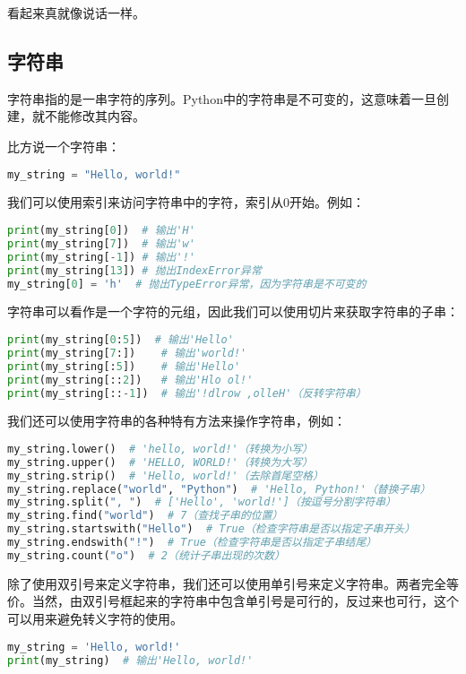 \documentclass[../main.tex]{subfiles}
\begin{document}
看起来真就像说话一样。

\subsection{字符串}

字符串指的是一串字符的序列。Python中的字符串是不可变的，这意味着一旦创建，就不能修改其内容。

比方说一个字符串：
\begin{lstlisting}[language=python]
my_string = "Hello, world!"
\end{lstlisting}
我们可以使用索引来访问字符串中的字符，索引从0开始。例如：
\begin{lstlisting}[language=python]
print(my_string[0])  # 输出'H'
print(my_string[7])  # 输出'w'
print(my_string[-1]) # 输出'!'
print(my_string[13]) # 抛出IndexError异常
my_string[0] = 'h'  # 抛出TypeError异常，因为字符串是不可变的
\end{lstlisting}

字符串可以看作是一个字符的元组，因此我们可以使用切片来获取字符串的子串：
\begin{lstlisting}[language=python]
print(my_string[0:5])  # 输出'Hello'
print(my_string[7:])    # 输出'world!'
print(my_string[:5])    # 输出'Hello'
print(my_string[::2])   # 输出'Hlo ol!'
print(my_string[::-1])  # 输出'!dlrow ,olleH'（反转字符串）
\end{lstlisting}

我们还可以使用字符串的各种特有方法来操作字符串，例如：
\begin{lstlisting}[language=python]
my_string.lower()  # 'hello, world!'（转换为小写）
my_string.upper()  # 'HELLO, WORLD!'（转换为大写）
my_string.strip()  # 'Hello, world!'（去除首尾空格）
my_string.replace("world", "Python")  # 'Hello, Python!'（替换子串）
my_string.split(", ")  # ['Hello', 'world!']（按逗号分割字符串）
my_string.find("world")  # 7（查找子串的位置）
my_string.startswith("Hello")  # True（检查字符串是否以指定子串开头）
my_string.endswith("!")  # True（检查字符串是否以指定子串结尾）
my_string.count("o")  # 2（统计子串出现的次数）
\end{lstlisting}

除了使用双引号来定义字符串，我们还可以使用单引号来定义字符串。两者完全等价。当然，由双引号框起来的字符串中包含单引号是可行的，反过来也可行，这个可以用来避免转义字符的使用。

\begin{lstlisting}[language=python]
my_string = 'Hello, world!'
print(my_string)  # 输出'Hello, world!'
\end{lstlisting}
\end{document}
